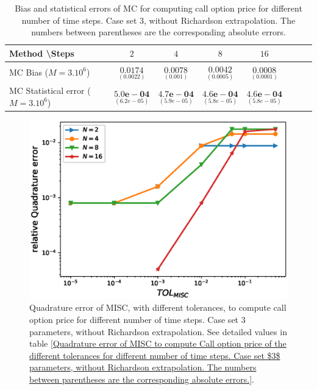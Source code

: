 \begin{table}[h!]
	\centering
	\begin{tabular}{l*{6}{c}r}
		Method \textbackslash  Steps            & $2$ & $4$ & $8$ & $16$  \\
		\hline
		MC Bias ($M=3.10^6$)   & 	$ \underset{(    0.0022)}{\mathbf{0.0174}}$  & $\underset{(0.001)}{\mathbf{0.0078}}$  & $\underset{(0.0005)}{\mathbf{0.0042}}$ & $\underset{(0.0001)}{\mathbf{0.0008}}$\\ 
		
		MC Statistical error ($M=3.10^6$)  &  $\underset{(   6.2e-05)} {\mathbf{5.0e-04}}$  & $\underset{(5.9e-05)} {\mathbf{4.7e-04}}$  & $\underset{(5.8e-05)} {\mathbf{4.6e-04 }}$ & $\underset{(5.8e-05)} {\mathbf{4.6e-04 }}$	\\
		
		\hline
	\end{tabular}
	\caption{Bias and statistical errors of MC   for computing call option price  for different number of time steps. Case set $3$, without Richardson extrapolation. The numbers between parentheses are the corresponding absolute errors.}
	\label{Bias and Statistical errors of MC ($M=10^6$)  for computing Call option price  for different number of time steps. Case set 3, without Richardson extrapolation. The numbers between parentheses are the corresponding absolute errors.}
\end{table}






	\begin{figure}[h!]
		\centering
		\includegraphics[width=0.5\linewidth]{./figures/rBergomi_MISC_quadratre_error/vs_TOL/set5/relative_quad_error_wrt_MISC_TOL_set5_non_rich}
	
	
	\caption{Quadrature error of MISC, with different tolerances, to compute call option price  for different number of time steps. Case  set $3$ parameters, without Richardson extrapolation.  See detailed values  in table \ref{Quadrature error of MISC to compute Call option price of the different tolerances for different number of time steps. Case  set $3$ parameters, without Richardson extrapolation. The numbers between parentheses are the corresponding absolute errors.}.}
	\label{fig:Quadrature_error_set3}
\end{figure}




